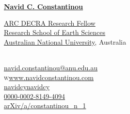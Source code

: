 \documentclass[10pt, letter]{article}
\def\www{http://www.navidconstantinou.com}
\newcommand{\rses}{
\href{http://rses.anu.edu.au}{\color{black}Research School of Earth Sciences}}
\newcommand{\anu}{
\href{http://www.anu.edu.au}{\color{black}Australian National University}}
\begin{document}
\reversemarginpar
{\huge{ \href{http://www.navidconstantinou.com}{\color{jhublue}\bf Navid C. Constantinou}}}\\[.42cm]
\parbox{.57\linewidth}{
{\href{https://rms.arc.gov.au/RMS/Report/Download/Report/1b0c8b2e-7bb0-4f2d-8f52-ad207cfbb41d/219}{\color{black}ARC DECRA Research Fellow}}\\
\rses\\
\anu, Australia\\
\mbox{}\\
}
\parbox{.43\linewidth}{
{}\hspace{.26cm}\href{mailto:navid.constantinou@anu.edu.au}{navid.constantinou@anu.edu.au}\\
\textsc{w}\hspace{.24cm}\href{\www}{www.navidconstantinou.com}\\
\faGithub\hspace{.24cm}\href{https://github.com/navidcy}{navidcy}\hspace{3.9em}\faVimeo\hspace{.24cm}\href{https://vimeo.com/navidcy}{navidcy}\\
{}\hspace{.24cm}\href{http://orcid.org/0000-0002-8149-4094}{0000-0002-8149-4094}\\
{}\hspace{.24cm}\href{https://arxiv.org/a/constantinou_n_1.html}{arXiv/a/constantinou\_n\_1}}






%
%
%
\end{document}
